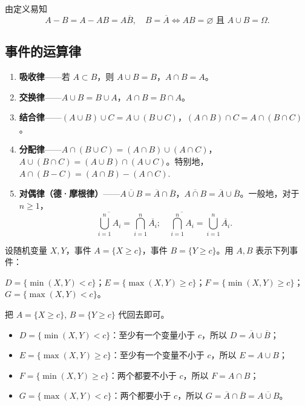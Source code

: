 \documentclass[lang=cn,11pt]{elegantbook}
\begin{document}
由定义易知
\[
A - B = A - AB = A\overline{B}, \quad B = \overline{A} \Leftrightarrow AB = \varnothing \text{ 且 } A \cup B = \Omega.
\]

\subsection{事件的运算律}

\begin{enumerate}
    \item \textbf{吸收律}——若 \(A \subset B\)，则 \(A \cup B = B\)，\(A \cap B = A\)。
    \item \textbf{交换律}——\(A \cup B = B \cup A\)，\(A \cap B = B \cap A\)。
    \item \textbf{结合律}——\((A \cup B) \cup C = A \cup (B \cup C)\)，\((A \cap B) \cap C = A \cap (B \cap C)\)。
    \item \textbf{分配律}——\(A \cap (B \cup C) = (A \cap B) \cup (A \cap C)\)，\(A \cup (B \cap C) = (A \cup B) \cap (A \cup C)\)。特别地，
    \(
    A \cap (B - C) = (A \cap B) - (A \cap C).
    \)
    \item \textbf{对偶律（德·摩根律）}——\(\overline{A \cup B} = \overline{A} \cap \overline{B}\)，\(\overline{A \cap B} = \overline{A} \cup \overline{B}\)。一般地，对于 \(n \ge 1\)，
    \[
    \overline{\bigcup_{i=1}^{n} A_i} = \bigcap_{i=1}^{n} \overline{A_i}; \quad \overline{\bigcap_{i=1}^{n} A_i} = \bigcup_{i=1}^{n} \overline{A_i}.
    \]
\end{enumerate}

\begin{exercise}\label{exer:1-30}
设随机变量 \(X,Y\)，事件 \(A=\{X\ge c\}\)，事件 \(B=\{Y\ge c\}\)。用 \(A,B\) 表示下列事件：\par
\(D=\{\min(X,Y)<c\}\)；\(E=\{\max(X,Y)\ge c\}\)；\(F=\{\min(X,Y)\ge c\}\)；\(G=\{\max(X,Y)<c\}\)。
\end{exercise}

\begin{solution}
把 \(A=\{X\ge c\}\), \(B=\{Y\ge c\}\) 代回去即可。
\begin{itemize}
    \item \(D=\{\min(X,Y)<c\}\)：至少有一个变量小于 \(c\)，所以 \(D=\overline{A}\cup\overline{B}\)；
    \item \(E=\{\max(X,Y)\ge c\}\)：至少有一个变量不小于 \(c\)，所以 \(E=A\cup B\)；
    \item \(F=\{\min(X,Y)\ge c\}\)：两个都要不小于 \(c\)，所以 \(F=A\cap B\)；
    \item \(G=\{\max(X,Y)<c\}\)：两个都要小于 \(c\)，所以 \(G=\overline{A}\cap\overline{B}=\overline{A\cup B}\)。
\end{itemize}
\end{solution}
\end{document}
